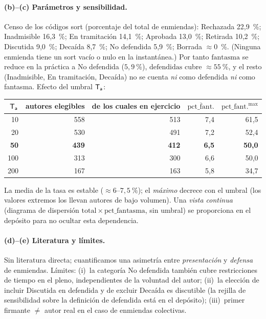\paragraph{(b)--(c) Parámetros y sensibilidad.} Censo de los códigos \og{}sort\fg{}
(porcentaje del total de enmiendas): Rechazada 22,9~\%; Inadmisible 16,3~\%; En
tramitación 14,1~\%; Aprobada 13,0~\%; Retirada 10,2~\%; Discutida 9,0~\%; Decaída
8,7~\%; No defendida 5,9~\%; Borrada $\approx$0~\%. (Ninguna enmienda tiene un sort
vacío o nulo en la instantánea.) Por tanto $\mathrm{fantasma}$ se reduce en la
práctica a \og{}No defendida\fg{} ($5{,}9~\%$), $\mathrm{defendidas}$ cubre
$\approx 55~\%$, y el resto (Inadmisible, En tramitación, Decaída) no se cuenta
\emph{ni} como defendida \emph{ni} como fantasma. Efecto del umbral $\mathsf{T_a}$:
\begin{center}\small
\begin{tabular}{rrrrr}
\toprule
$\mathsf{T_a}$ & autores elegibles & de los cuales en ejercicio & $\overline{\mathrm{pct\_fant.}}$ & $\mathrm{pct\_fant.}^{\max}$ \\
\midrule
10  & 558 & 513 & 7,4 & 61,5 \\
20  & 530 & 491 & 7,2 & 52,4 \\
\textbf{50}  & \textbf{439} & \textbf{412} & \textbf{6,5} & \textbf{50,0} \\
100 & 313 & 300 & 6,6 & 50,0 \\
200 & 167 & 163 & 5,8 & 34,7 \\
\bottomrule
\end{tabular}
\end{center}
La media de la tasa es estable ($\approx 6$--$7{,}5~\%$); el \emph{máximo} decrece
con el umbral (los valores extremos los llevan autores de bajo volumen). Una
\emph{vista continua} (diagrama de dispersión $\mathrm{total}\times\mathrm{pct\_fantasma}$,
sin umbral) se proporciona en el depósito para no ocultar esta dependencia.

\paragraph{(d)--(e) Literatura y límites.} Sin literatura directa; cuantificamos una
asimetría entre \emph{presentación} y \emph{defensa} de enmiendas. Límites: (i)~la
categoría \og{}No defendida\fg{} también cubre restricciones de tiempo en el pleno,
independientes de la voluntad del autor; (ii)~la elección de incluir
\og{}Discutida\fg{} en \og{}defendida\fg{} y de excluir \og{}Decaída\fg{} es
discutible (la rejilla de sensibilidad sobre la definición de \og{}defendida\fg{}
está en el depósito); (iii)~\og{}primer firmante\fg{} $\ne$ \og{}autor real\fg{} en
el caso de enmiendas colectivas.

